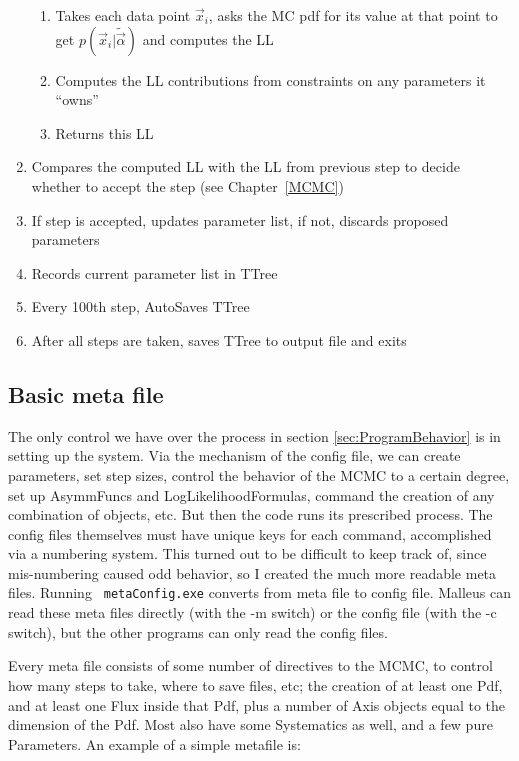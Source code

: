 \begin{enumerate}
\begin{enumerate}
  \item Takes each data point $\vec{x}_i$, asks the MC pdf for
    its value at that point to get $\displaystyle
    p(\vec{x}_i|\tilde{\vec{\alpha}})$ and computes the LL
  \item Computes the LL contributions from constraints on any
    parameters it ``owns''
  \item Returns this LL
  \end{enumerate}
\item Compares the computed LL with the LL from previous step to
  decide whether to accept the step (see \mbox{Chapter \ref{MCMC}})
\item If step is accepted, updates parameter list, if not, discards
  proposed parameters
\item Records current parameter list in TTree
\item Every 100th step, AutoSaves TTree
\item After all steps are taken, saves TTree to output file and exits
\end{enumerate}

\subsection{Basic meta file}
\label{sec:BasicMeta}
The only control we have over the process in section
\ref{sec:ProgramBehavior} is in setting up the system.  Via the
mechanism of the config file, we can create parameters, set step
sizes, control the behavior of the MCMC to a certain degree, set up
AsymmFuncs and LogLikelihoodFormulas, command the creation of any
combination of objects, etc.  But then the code runs its prescribed
process.  The config files themselves must have unique keys for each
command, accomplished via a numbering system.  This turned out to be
difficult to keep track of, since mis-numbering caused odd behavior,
so I created the much more readable meta files.  Running {\tt
  metaConfig.exe} converts from meta file to config file.  Malleus can
read these meta files directly (with the -m switch) or the config file
(with the -c switch), but the other programs can only read the config
files.

Every meta file consists of some number of directives to the MCMC, to
control how many steps to take, where to save files, etc; the creation
of at least one Pdf, and at least one Flux inside that Pdf, plus a
number of Axis objects equal to the dimension of the Pdf.  Most also
have some Systematics as well, and a few pure Parameters.  An example
of a simple metafile is:

